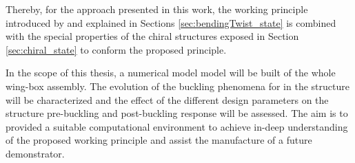  Thereby, for the approach presented in this work, the working principle introduced by \cite{Raither2013a} and explained in Sections \ref{sec:bendingTwist_state} is combined with the special properties of the chiral structures exposed in Section \ref{sec:chiral_state} to conform the proposed principle. 

  In the scope of this thesis, a numerical model model will be built of the whole wing-box assembly. The evolution of the buckling phenomena for in the structure will be characterized and the effect of the different design parameters on the structure pre-buckling and post-buckling response will be assessed. The aim is to provided a suitable computational environment to achieve in-deep understanding of the proposed working principle and assist the manufacture of a future demonstrator.

